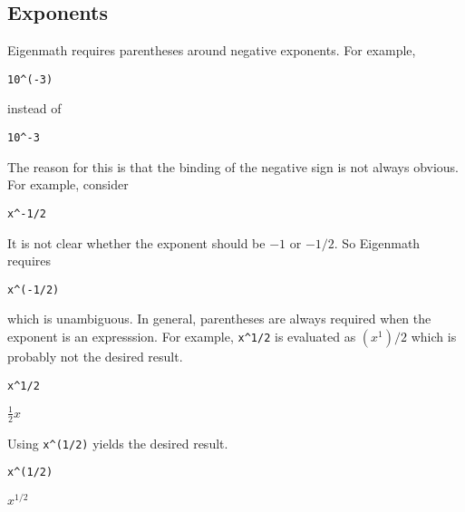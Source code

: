 
\subsection{Exponents}
Eigenmath requires parentheses around negative exponents.
For example,

\begin{Verbatim}[formatcom=\color{blue}]
10^(-3)
\end{Verbatim}

instead of

\begin{Verbatim}[formatcom=\color{blue}]
10^-3
\end{Verbatim}

The reason for this is that the binding of the negative sign is not always
obvious.
For example, consider

\begin{Verbatim}[formatcom=\color{blue}]
x^-1/2
\end{Verbatim}

It is not clear whether the exponent should be $-1$ or $-1/2$.
So Eigenmath requires

\begin{Verbatim}[formatcom=\color{blue}]
x^(-1/2)
\end{Verbatim}

which is unambiguous.
In general, parentheses are always required when the exponent
is an expresssion.
For example, \verb$x^1/2$ is evaluated as $(x^1)/2$ which
is probably not the desired result.

\begin{Verbatim}[formatcom=\color{blue}]
x^1/2
\end{Verbatim}

$\displaystyle \frac{1}{2}x$

Using \verb$x^(1/2)$ yields the desired result.

\begin{Verbatim}[formatcom=\color{blue}]
x^(1/2)
\end{Verbatim}

$\displaystyle x^{1/2}$
